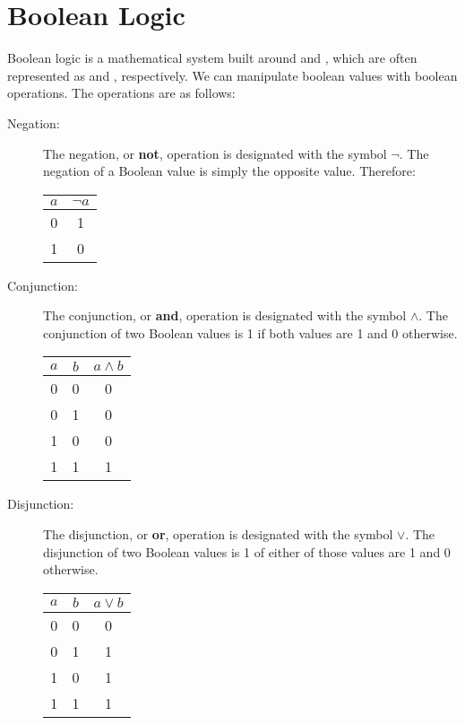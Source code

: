 \documentclass[letterpaper]{article}
\begin{document}
\section{Boolean Logic}
Boolean logic is a mathematical system built around  and , which are often represented as  and , respectively. We can manipulate boolean values with boolean operations. The operations are as follows:
\begin{description}
    \item[Negation:] The negation, or \textbf{not}, operation is designated with the symbol $\neg$. The negation of a Boolean value is simply the opposite value. Therefore: 
    \begin{center}
        \begin{tabular}{c|c}
            $a$ & $\neg a$ \\ 
            \hline 
            0 & 1 \\ 
            1 & 0
        \end{tabular}
    \end{center}
    
    \item[Conjunction:] The conjunction, or \textbf{and}, operation is designated with the symbol $\land$. The conjunction of two Boolean values is 1 if both values are 1 and 0 otherwise.
    \begin{center}
        \begin{tabular}{c c|c}
            $a$ & $b$ & $a \land b$ \\ 
            \hline 
            0 & 0 & 0 \\ 
            0 & 1 & 0 \\ 
            1 & 0 & 0 \\ 
            1 & 1 & 1
        \end{tabular}
    \end{center}

    \item[Disjunction:] The disjunction, or \textbf{or}, operation is designated with the symbol $\lor$. The disjunction of two Boolean values is 1 of either of those values are 1 and 0 otherwise.   
    \begin{center}
        \begin{tabular}{c c|c}
            $a$ & $b$ & $a \lor b$ \\ 
            \hline 
            0 & 0 & 0 \\ 
            0 & 1 & 1 \\ 
            1 & 0 & 1 \\ 
            1 & 1 & 1
        \end{tabular}
    \end{center} 
\end{description}
\end{document}
